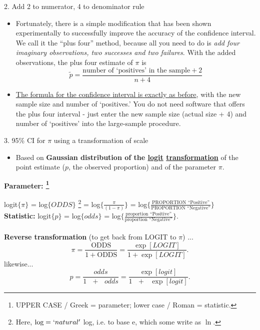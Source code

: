 \documentclass[10pt]{beamer}\usepackage[]{graphicx}\usepackage[]{color}
\begin{document}
\begin{frame}{2. Add 2 to numerator, 4 to denominator rule}
	\small
	\begin{itemize}
		\setlength\itemsep{1em}
		
		\item Fortunately, there is a simple modification that has been shown experimentally
		to successfully improve the accuracy of the confidence interval. We call it the ``plus
		four'' method, because all you need to do is \textit{add four imaginary observations, 
			two successes and two failures}. With the added observations, the plus four estimate of $\pi$ is
		$$\widetilde{p} =\frac{\textrm{number of `positives' in the sample} + 2}{n+4}$$ 
		
		\item \underline{The formula for the confidence interval is exactly as before}, with the new sample
		size and number of `positives.' You do not need software that offers the plus four
		interval - just enter the new sample size (actual size + 4) and number of `positives'
		into the large-sample procedure.
	\end{itemize}
\end{frame}


\begin{frame}{3. 95\% CI for $\pi$ using a transformation of scale}
	
	\begin{itemize}
		\item Based on \textbf{Gaussian distribution of the \underline{logit} \underline{transformation}} of  the point estimate ($p$, the observed proportion) and of  the parameter $\pi.$
	\end{itemize}
	
	\small
	\textbf{Parameter: \footnote{UPPER CASE / Greek = parameter; lower case / Roman = statistic.} }
	
	logit$\{ \pi \}$
	= log$\{ ODDS \}$ \footnote{Here, $\textrm{log} = `natural'$ log, i.e. to base e, which some write as $\ln.$} 
	=   log$\big\{ \frac{\pi}{(1-\pi)} \big\}$ 
	=  log$ \big\{ \frac{ \textrm{PROPORTION ``Positive''} }
	{ \textrm{PROPORTION ``Negative''} } \big\}$ \\
	
	\textbf{Statistic: } logit$\{ p \}$
	= log$\{ odds \}$ 
	=  log$ \big\{ \frac{ \textrm{proportion ``Positive''} }
	{ \textrm{proportion ``Negative''} } \big\}.$ \\ \ \\
	
	\textbf{Reverse transformation} (to get back from LOGIT to $\pi $) ...
	$$\pi = \frac{\textrm{ODDS}}{1 + \textrm{ODDS}} = \frac{\exp [LOGIT]}{1 + \exp[LOGIT]}.$$
	likewise...
	$$p = \frac{odds}{1 \textrm{ }+ \textrm{ }odds} = \frac{\exp [logit]}{1\textrm{ }+\textrm{ }\exp [logit]}.$$
	
	
\end{frame}
\end{document}
